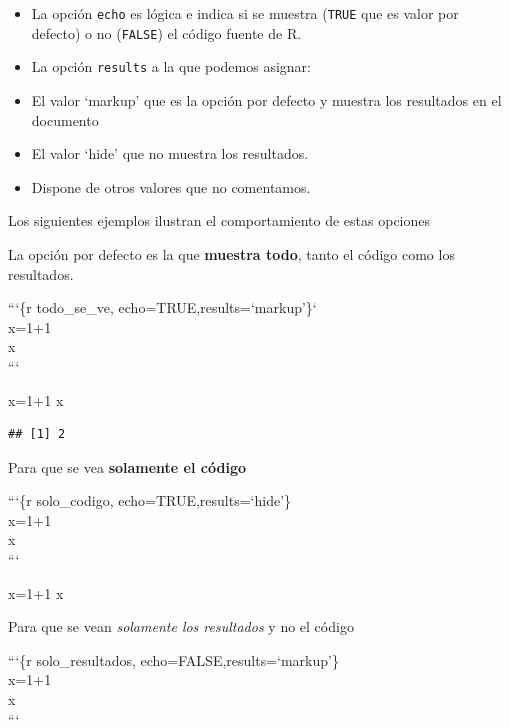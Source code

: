 \documentclass[]{article}
\newenvironment{Shaded}{\begin{snugshade}}{\end{snugshade}}
\newcommand{\DecValTok}[1]{\textcolor[rgb]{0.00,0.00,0.81}{{#1}}}
\newcommand{\NormalTok}[1]{{#1}}
\begin{document}
\begin{itemize}
\itemsep1pt\parskip0pt
\item
  La opción \texttt{echo} es lógica e indica si se muestra
  (\texttt{TRUE} que es valor por defecto) o no (\texttt{FALSE}) el
  código fuente de R.
\item
  La opción \texttt{results} a la que podemos asignar:
\item
  El valor `markup' que es la opción por defecto y muestra los
  resultados en el documento
\item
  El valor `hide' que no muestra los resultados.
\item
  Dispone de otros valores que no comentamos.
\end{itemize}

Los siguientes ejemplos ilustran el comportamiento de estas opciones

La opción por defecto es la que \textbf{muestra todo}, tanto el código
como los resultados.

```\{r todo\_se\_ve, echo=TRUE,results=`markup'\}`\\x=1+1\\x\\```

\begin{Shaded}
\begin{Highlighting}[]
\NormalTok{x=}\DecValTok{1+1}
\NormalTok{x}
\end{Highlighting}
\end{Shaded}

\begin{verbatim}
## [1] 2
\end{verbatim}

Para que se vea \textbf{solamente el código}

```\{r solo\_codigo, echo=TRUE,results=`hide'\}\\x=1+1\\x\\```

\begin{Shaded}
\begin{Highlighting}[]
\NormalTok{x=}\DecValTok{1+1}
\NormalTok{x}
\end{Highlighting}
\end{Shaded}

Para que se vean \emph{solamente los resultados} y no el código

```\{r solo\_resultados, echo=FALSE,results=`markup'\}\\x=1+1\\x\\```
\end{document}
